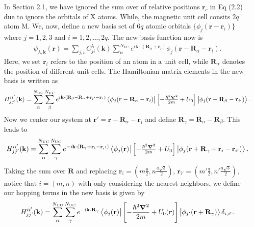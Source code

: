 \documentclass{report}
\newcommand{\f}[2]{\dfrac{#1}{#2}}
\begin{document}
In Section 2.1, we have ignored the sum over of relative positions $\mathbf{r}_{c}$ in Eq (2.2) due to ignore the orbitals of X atoms. While, the magnetic unit cell consits $2q$ atom M. We, now, define a new basis set of $6q$ atomic orbitals $\{ \phi_{j}(\mathbf{r} - \mathbf{r}_{i}) \}$ where $j=1,2,3$ and $i = 1,2,...,2q$.
The new basis function now is
\begin{gather}
	\psi_{\lambda,\mathbf{k}}(\mathbf{r}) = \sum_{j,i} C_{ji}^{\lambda}(\mathbf{k}) \sum_{{\alpha}}^{N_{\text{UC}}} e^{i\mathbf{k}\cdot(\mathbf{R}_{\alpha} + \mathbf{r}_{i})} \phi_{j}(\mathbf{r} - \mathbf{R}_{\alpha} - \mathbf{r}_{i}).
\end{gather}
Here, we set $\mathbf{r}_{i}$ refers to the position of an atom in a unit cell, while $\mathbf{R}_{\alpha}$ denotes the position of different unit cells.
The Hamiltonian matrix elements in the new basis is written as
\begin{gather}
	H_{jj'}^{ii'}(\mathbf{k})
	= \sum_{{\alpha}}^{N_\text{UC}}\sum_{{\beta}}^{N_\text{UC}} e^{i \mathbf{k} \cdot (\mathbf{R}_{\beta} - \mathbf{R}_{\alpha} + \mathbf{r}_{i'} - \mathbf{r}_{i})}  \bra{\phi_{j}(\mathbf{r} - \mathbf{R}_{\alpha} - \mathbf{r}_{i})} \left[-\tfrac{\hbar^{2} \boldsymbol{\nabla}^{2}}{2m} + U_{0}\right] \ket{\phi_{j}(\mathbf{r} - \mathbf{R}_{\beta} - \mathbf{r}_{i'})}.
\end{gather}
Now we center our system at $\mathbf{r}'=\mathbf{r} - \mathbf{R}_{\alpha} - \mathbf{r}_{i}$ and define $\mathbf{R}_{\gamma} = \mathbf{R}_{\alpha} - \mathbf{R}_{\beta}$. This leads to
\begin{gather}
	H_{jj'}^{ii'}(\mathbf{k})
	= \sum_{{\alpha}}^{N_\text{UC}}\sum_{{\gamma}}^{N_\text{UC}} e^{-i \mathbf{k} \cdot (\mathbf{R}_{\gamma} + \mathbf{r}_{i} - \mathbf{r}_{i'})}  \bra{\phi_{j}(\mathbf{r})} \left[-\tfrac{\hbar^{2} \boldsymbol{\nabla}^{2}}{2m} + U_{0}\right] \ket{\phi_{j}(\mathbf{r} + \mathbf{R}_{\gamma} + \mathbf{r}_{i} - \mathbf{r}_{i'})}.
\end{gather}
Taking the sum over $\mathbf{R}$ and replacing $\mathbf{r}_{i} = \left(m \frac{a}{2}, n \frac{a\sqrt{3}}{2}\right)$, $\mathbf{r}_{i'} = \left(m' \frac{a}{2}, n' \frac{a\sqrt{3}}{2}\right)$, notice that $i = (m,n)$ with only considering the nearest-neighbors, we define our hopping terms in the new basis is given by
\begin{gather}
	H_{jj'}^{ii'}(\mathbf{k}) = \sum_{{\alpha}}^{N_\text{UC}}\sum_{{\gamma}}^{N_\text{UC}} e^{-i \mathbf{k}\cdot \mathbf{R}_{\gamma}} \bra{\phi_{j}(\mathbf{r})} \left[-\f{\hbar^{2} \boldsymbol{\nabla}^{2}}{2m} + U_{0}(\mathbf{r})\right] \ket{\phi_{j'}(\mathbf{r}+\mathbf{R}_{\gamma})}\delta_{i,i'}.
\end{gather}
\end{document}
